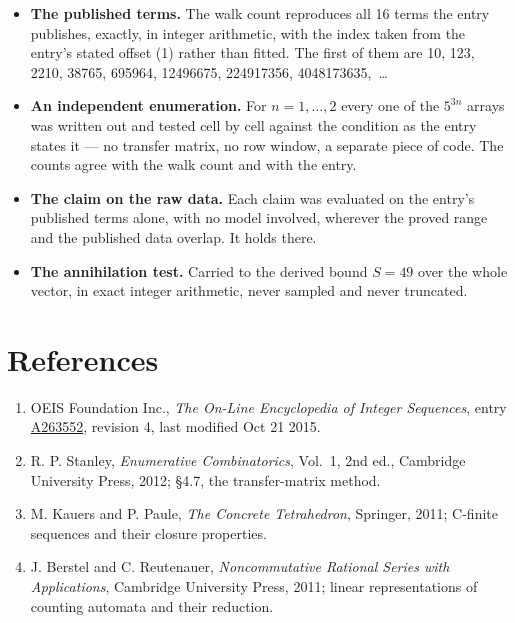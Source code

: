 \documentclass[11pt]{article}
\theoremstyle{definition}
\begin{document}
\begin{itemize}

\item {\bfseries The published terms.} The walk count reproduces all 16 terms the entry publishes, exactly, in integer arithmetic, with the index taken from the entry's stated offset (1) rather than fitted. The first of them are 10, 123, 2210, 38765, 695964, 12496675, 224917356, 4048173635,~\dots

\item {\bfseries An independent enumeration.} For $n = 1,\dots,2$ every one of the $5^{3n}$ arrays was written out and tested cell by cell against the condition as the entry states it --- no transfer matrix, no row window, a separate piece of code. The counts agree with the walk count and with the entry.

\item {\bfseries The claim on the raw data.} Each claim was evaluated on the entry's published terms alone, with no model involved, wherever the proved range and the published data overlap. It holds there.

\item {\bfseries The annihilation test.} Carried to the derived bound $S = 49$ over the whole vector, in exact integer arithmetic, never sampled and never truncated.

\end{itemize}

\section{References}

\begin{enumerate}

\item OEIS Foundation Inc., \emph{The On-Line Encyclopedia of Integer Sequences}, entry \href{https://oeis.org/A263552}{A263552}, revision 4, last modified Oct 21 2015.

\item R. P. Stanley, \emph{Enumerative Combinatorics}, Vol.~1, 2nd ed., Cambridge University Press, 2012; \S4.7, the transfer-matrix method.

\item M. Kauers and P. Paule, \emph{The Concrete Tetrahedron}, Springer, 2011; C-finite sequences and their closure properties.

\item J. Berstel and C. Reutenauer, \emph{Noncommutative Rational Series with Applications}, Cambridge University Press, 2011; linear representations of counting automata and their reduction.

\end{enumerate}
\end{document}
